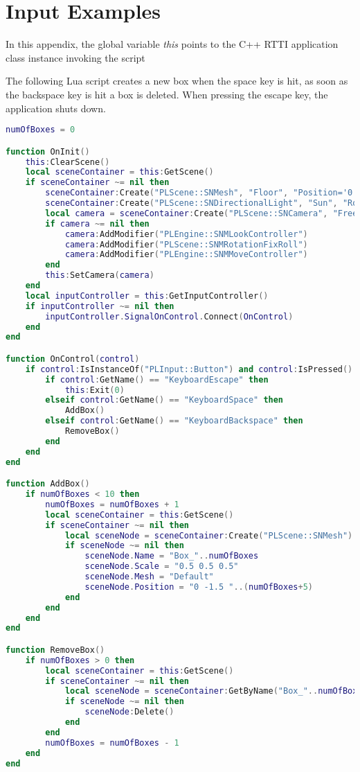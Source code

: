 \chapter{Input Examples}
In this appendix, the global variable \emph{this} points to the C++ \ac{RTTI} application class instance invoking the script 

The following Lua script creates a new box when the space key is hit, as soon as the backspace key is hit a box is deleted. When pressing the escape key, the application shuts down.
\begin{lstlisting}[language=lua]
numOfBoxes = 0

function OnInit()
	this:ClearScene()
	local sceneContainer = this:GetScene()
	if sceneContainer ~= nil then
		sceneContainer:Create("PLScene::SNMesh", "Floor", "Position='0 -2.1 5' Scale='4 0.1 4' Rotation='0 180 0' Mesh='Default'")
		sceneContainer:Create("PLScene::SNDirectionalLight", "Sun", "Rotation='45 0 0'")
		local camera = sceneContainer:Create("PLScene::SNCamera", "FreeCamera")
		if camera ~= nil then
			camera:AddModifier("PLEngine::SNMLookController")
			camera:AddModifier("PLScene::SNMRotationFixRoll")
			camera:AddModifier("PLEngine::SNMMoveController")
		end
		this:SetCamera(camera)
	end
	local inputController = this:GetInputController()
	if inputController ~= nil then
		inputController.SignalOnControl.Connect(OnControl)
	end
end

function OnControl(control)
	if control:IsInstanceOf("PLInput::Button") and control:IsPressed() then
		if control:GetName() == "KeyboardEscape" then
			this:Exit(0)
		elseif control:GetName() == "KeyboardSpace" then
			AddBox()
		elseif control:GetName() == "KeyboardBackspace" then
			RemoveBox()
		end
	end
end

function AddBox()
	if numOfBoxes < 10 then
		numOfBoxes = numOfBoxes + 1
		local sceneContainer = this:GetScene()
		if sceneContainer ~= nil then
			local sceneNode = sceneContainer:Create("PLScene::SNMesh")
			if sceneNode ~= nil then
				sceneNode.Name = "Box_"..numOfBoxes
				sceneNode.Scale = "0.5 0.5 0.5"
				sceneNode.Mesh = "Default"
				sceneNode.Position = "0 -1.5 "..(numOfBoxes+5)
			end
		end
	end
end

function RemoveBox()
	if numOfBoxes > 0 then
		local sceneContainer = this:GetScene()
		if sceneContainer ~= nil then
			local sceneNode = sceneContainer:GetByName("Box_"..numOfBoxes)
			if sceneNode ~= nil then
				sceneNode:Delete()
			end
		end
		numOfBoxes = numOfBoxes - 1
	end
end
\end{lstlisting}
